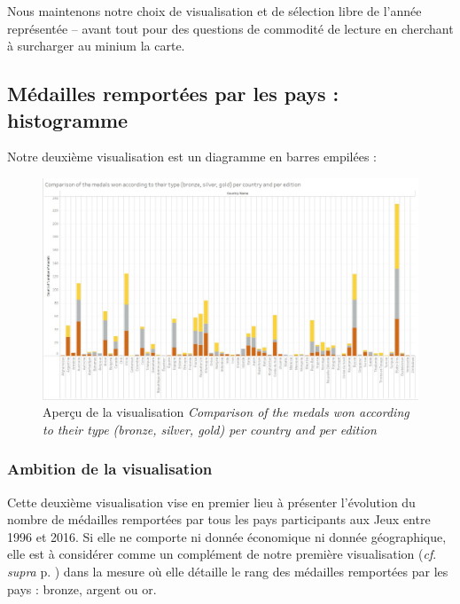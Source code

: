 \documentclass[hidelinks, 12pt]{report}
\begin{document}
Nous maintenons notre choix de visualisation et de sélection libre de l'année représentée -- avant tout pour des questions de commodité de lecture en cherchant à surcharger au minium la carte.





%





\subsection{Médailles remportées par les pays : histogramme}

Notre deuxième visualisation est un diagramme en barres empilées :

\begin{center}
	\begin{figure}[H]
		\setlength{\belowcaptionskip}{-35pt}
		\includegraphics[scale=0.3]{images/datavis-medals-world-histo.jpeg}
		\captionsetup{justification=centering}
		\caption{Aperçu de la visualisation \textit{Comparison of the medals won according to their type (bronze, silver, gold) per country and per edition}}
	\end{figure}
\end{center}

\subsubsection{Ambition de la visualisation}

Cette deuxième visualisation vise en premier lieu à présenter l'évolution du nombre de médailles remportées par tous les pays participants aux Jeux entre 1996 et 2016. Si elle ne comporte ni donnée économique ni donnée géographique, elle est à considérer comme un complément de notre première visualisation (\textit{cf}. \textit{supra} p. \pageref{map}) dans la mesure où elle détaille le rang des médailles remportées par les pays : bronze, argent ou or.
\end{document}
